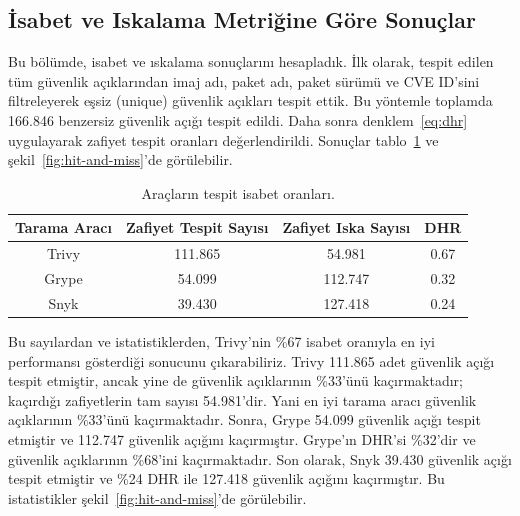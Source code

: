 \subsection{İsabet ve Iskalama Metriğine Göre Sonuçlar}\label{subsec:ResultsbyHitandMissMetric}

Bu bölümde, isabet ve ıskalama sonuçlarını hesapladık. İlk olarak, tespit edilen tüm güvenlik açıklarından imaj adı, paket adı, paket sürümü ve CVE ID'sini filtreleyerek eşsiz (unique) güvenlik açıkları tespit ettik. Bu yöntemle toplamda 166.846 benzersiz güvenlik açığı tespit edildi. Daha sonra denklem~\ref{eq:dhr} uygulayarak zafiyet tespit oranları değerlendirildi. Sonuçlar tablo~\ref{tab:hit-and-miss} ve şekil~\ref{fig:hit-and-miss}'de görülebilir.

\begin{table}[!htbp]
    \caption{Araçların tespit isabet oranları.}\label{tab:hit-and-miss}
    \centering
    \begin{tabular}{ |c|c|c|c| }
        \hline
        Tarama Aracı & Zafiyet Tespit Sayısı & Zafiyet Iska Sayısı & DHR \\
        \hline
        Trivy & 111.865 &  54.981 & 0.67 \\
        Grype &  54.099 & 112.747 & 0.32 \\
        Snyk  &  39.430 & 127.418 & 0.24 \\
        \hline
    \end{tabular}
\end{table}

Bu sayılardan ve istatistiklerden, Trivy'nin \%67 isabet oranıyla en iyi performansı gösterdiği sonucunu çıkarabiliriz. Trivy 111.865 adet güvenlik açığı tespit etmiştir, ancak yine de güvenlik açıklarının \%33'ünü kaçırmaktadır; kaçırdığı zafiyetlerin tam sayısı 54.981'dir. Yani en iyi tarama aracı güvenlik açıklarının \%33'ünü kaçırmaktadır. Sonra, Grype 54.099 güvenlik açığı tespit etmiştir ve 112.747 güvenlik açığını kaçırmıştır. Grype'ın DHR'si \%32'dir ve güvenlik açıklarının \%68'ini kaçırmaktadır. Son olarak, Snyk 39.430 güvenlik açığı tespit etmiştir ve \%24 DHR ile 127.418 güvenlik açığını kaçırmıştır. Bu istatistikler şekil~\ref{fig:hit-and-miss}'de görülebilir.

